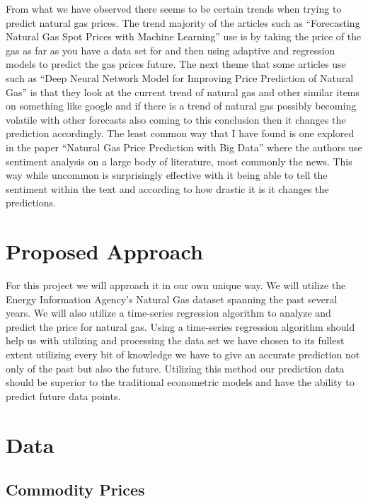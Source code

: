 \documentclass[final]{cvpr}
\begin{document}
    From what we have observed there seems to be certain trends when trying to
    predict natural gas prices. The trend majority of the articles such as
    “Forecasting Natural Gas Spot Prices with Machine Learning” use is by taking
    the price of the gas as far as you have a data set for and then using
    adaptive and regression models to predict the gas prices future. The next
    theme that some articles use such as “Deep Neural Network Model for
    Improving Price Prediction of Natural Gas” is that they look at the current
    trend of natural gas and other similar items on something like google and if
    there is a trend of natural gas possibly becoming volatile with other
    forecasts also coming to this conclusion then it changes the prediction
    accordingly. The least common way that I have found is one explored in the
    paper “Natural Gas Price Prediction with Big Data” where the authors use
    sentiment analysis on a large body of literature, most commonly the news.
    This way while uncommon is surprisingly effective with it being able to tell
    the sentiment within the text and according to how drastic it is it changes
    the predictions.

\section{Proposed Approach}

    For this project we will approach it in our own unique way. We will utilize the
    Energy Information Agency's Natural Gas dataset spanning the past several
    years. We will also utilize a time-series regression algorithm to analyze and
    predict the price for natural gas. Using a time-series regression algorithm
    should help us with utilizing and processing the data set we have chosen to its
    fullest extent utilizing every bit of knowledge we have to give an accurate
    prediction not only of the past but also the future. Utilizing this method our
    prediction data should be superior to the traditional econometric models and
    have the ability to predict future data points.

\section{Data}

\subsection{Commodity Prices}
\end{document}

